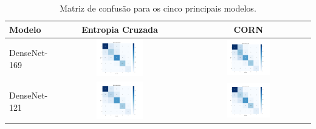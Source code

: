 \begin{table}[!htbp]
    \centering
    \caption{Matriz de confusão para os cinco principais modelos.}
    \label{tab:matrizes_confusao}
    \begin{tabular}{|l|c|c|}
        \hline
        \textbf{Modelo} & \textbf{Entropia Cruzada} & \textbf{CORN} \\ \hline
        DenseNet-169 & \includegraphics[width=0.37\textwidth]{figs/confusion_matrices/densenet169_cm_cross_entropy.png} & \includegraphics[width=0.37\textwidth]{figs/confusion_matrices/densenet169_cm_corn.png} \\ \hline
        DenseNet-121 & \includegraphics[width=0.37\textwidth]{figs/confusion_matrices/densenet121_cm_cross_entropy.png} & \includegraphics[width=0.37\textwidth]{figs/confusion_matrices/densenet121_cm_corn.png} \\ \hline

\end{tabular}
\end{table}
